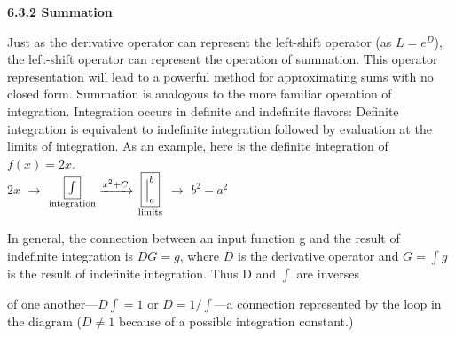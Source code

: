 \documentclass[a4paper]{article}
\begin{document}
\noindent \Large{{\bf 6.3.2 Summation}} \vspace{0.5cm}


\noindent 
{Just as the derivative operator can represent the left-shift operator (as $L =
e^D$), the left-shift operator can represent the operation of summation. This
operator representation will lead to a powerful method for approximating
sums with no closed form.
Summation is analogous to the more familiar operation of integration.
Integration occurs in definite and indefinite flavors: Definite integration
is equivalent to indefinite integration followed by evaluation at the limits
of integration. As an example, here is the definite integration of $f(x) = 2x$.}
\\


\hangindent=1.5cm {$2x$ $\longrightarrow$ $\underset{\textrm{integration}}{\fbox{\huge{$\int$}}}\xrightarrow{x^2+C}$ $\underset{\textrm{limits}}{\fbox{$\Big|_a^b$}}$} $\longrightarrow$ $b^2-a^2$ \vspace{0.5cm}


\noindent In general, the connection between an input function g and the result of
indefinite integration is $DG = g$, where $D$ is the derivative operator and
$G=\int g$ is the result of indefinite integration. Thus D and $\int$ are inverses\\



\newpage


\pagestyle{fancy}



\renewcommand{\headrulewidth}{0pt}
\fancyhf{}

\noindent \Large {of one another---$D\int=1$ or $D=1/\int$---a connection represented by the loop in the diagram ($D\not=1$ because of a possible integration constant.)}
\\
\\
\\
\end{document}
